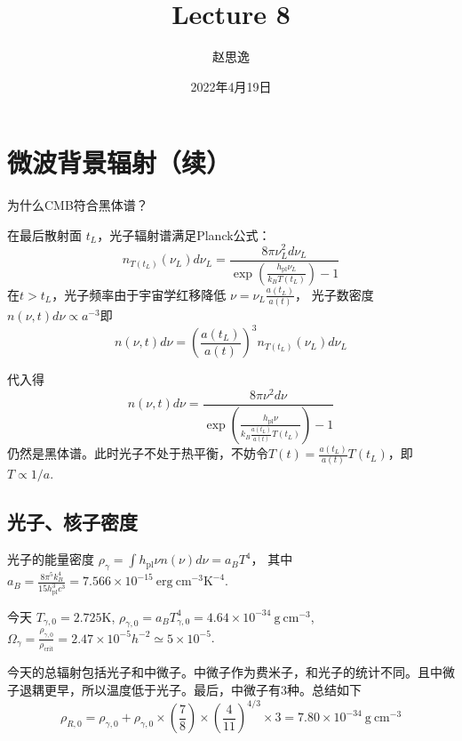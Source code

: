 \documentclass[12pt]{ctexart}
\title{Lecture 8}
\author{赵思逸}
\date{2022年4月19日}
\begin{document}
\maketitle

\section*{微波背景辐射（续）}

为什么CMB符合黑体谱？

在最后散射面 $t_L$，光子辐射谱满足Planck公式：
\begin{equation}
    n_{T(t_L)}(\nu_L) d \nu_L=\frac{8 \pi \nu_L^{2} d \nu_L}{\exp \left(\frac{h_\text{pl} \nu_L}{k_{B} T(t_L)} \right)-1}
\end{equation}
在$t>t_L$，光子频率由于宇宙学红移降低 $\nu=\nu_{L} \frac{a(t_L)}{a(t)}$，
光子数密度 $n\left(\nu, t\right) d\nu \propto a^{-3}$即
\begin{equation}
    n(\nu, t) d \nu=\left(\frac{a(t_L)}{a(t)}\right)^{3} n_{T\left(t_{L}\right)}\left(\nu_{L}\right) d \nu_{L}
\end{equation}

代入得
\begin{equation}
    n(\nu, t) d \nu = \frac{8 \pi \nu^{2} d \nu}{\exp \left(\frac{h_\text{pl} \nu}{k_{B} \frac{a(t_L)}{a(t)}T(t_L)}   \right)-1}
\end{equation}
仍然是黑体谱。此时光子不处于热平衡，不妨令$T(t)=\frac{a(t_L)}{a(t)}T(t_L)$，即$T\propto 1/a$.

\subsection*{光子、核子密度}

光子的能量密度 $\rho_\gamma = \int h_{\mathrm{pl}} \nu n(\nu) d\nu = a_B T^4$， 其中 $a_B=\frac{8\pi^5 k_B^4}{15 h_{\mathrm{pl}}^3 c^3 } = 7.566\times 10^{-15} \mathrm{~erg~cm^{-3}K^{-4}}$.

今天 $T_{\gamma,0} = 2.725 \mathrm{K}$, $\rho_{\gamma,0}=a_B T_{\gamma,0}^4 = 4.64\times 10^{-34} \mathrm{~g~cm^{-3}}$,
$\Omega_\gamma = \frac{\rho_{\gamma,0}}{\rho_\text{crit}} = 2.47\times 10^{-5} h^{-2} \simeq 5\times 10^{-5}$.

今天的总辐射包括光子和中微子。中微子作为费米子，和光子的统计不同。且中微子退耦更早，所以温度低于光子。最后，中微子有3种。总结如下
\begin{equation}
    \rho_{R, 0}=\rho_{\gamma, 0}+\rho_{\gamma, 0} \times\left(\frac{7}{8}\right) \times\left(\frac{4}{11}\right)^{4 / 3} \times 3 =7.80 \times 10^{-34} \mathrm{~g~cm^{-3}}
\end{equation}
\end{document}
